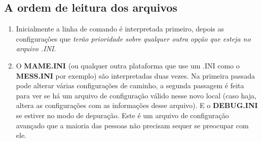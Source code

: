 \documentclass[letterpaper,10pt,brazil]{sphinxmanual}
\begin{document}
\subsection{A ordem de leitura dos arquivos}
\label{advanced/multiconfig:advanced-multi-cfg}\label{advanced/multiconfig:a-ordem-de-leitura-dos-arquivos}\begin{enumerate}
\item {} 
Inicialmente a linha de comando é interpretada primeiro, depois
as configurações que \emph{terão prioridade sobre qualquer outra
opção que esteja no arquivo .INI}.

\item {} 
O \textbf{MAME.INI} (ou qualquer outra plataforma que use um .INI
como o \textbf{MESS.INI} por exemplo) são interpretadas duas vezes.
Na primeira passada pode alterar várias configurações de
caminho, a segunda passagem é feita para ver se há um arquivo de
configuração válido nesse novo local (caso haja, altera as
configurações com as informações desse arquivo).
E o \textbf{DEBUG.INI} se estiver no modo de depuração.
Este é um arquivo de configuração avançado que a maioria das
pessoas não precisam sequer se preocupar com ele.

\end{enumerate}
\end{document}
